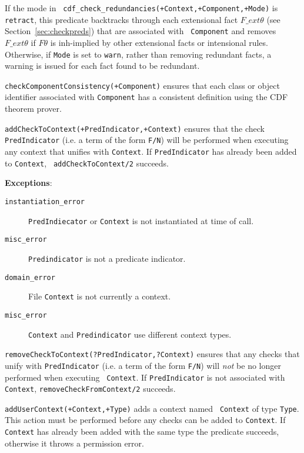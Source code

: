 \begin{description}
If the mode in {\tt
cdf\_check\_redundancies(+Context,+Component,+Mode)} is {\tt retract},
this predicate backtracks through each extensional fact $F\_ext\theta$
(see Section~\ref{sec:checkpreds}) that are associated with {\tt
Component} and removes $F\_ext\theta$ if $F\theta$ is {\sc
inh}-implied by other extensional facts or intensional rules.
Otherwise, if {\tt Mode} is set to {\tt warn}, rather than removing
redundant facts, a warning is issued for each fact found to be
redundant.

{\tt checkComponentConsistency(+Component)} ensures that each class or
object identifier associated with {\tt Component} has a consistent
definition using the CDF theorem prover.

{\tt addCheckToContext(+PredIndicator,+Context)} ensures that the
check {\tt PredIndicator} (i.e. a term of the form {\tt F/N}) will be
performed when executing any context that unifies with {\tt Context}.
If {\tt PredIndicator} has already been added to {\tt Context}, {\tt
addCheckToContext/2} succeeds. 

{\bf Exceptions}:
    \begin{description}
    \item[{\tt instantiation\_error}]
    	{\tt PredIndiecator} or {\tt Context} is not instantiated at
	    time of call. 
    \item[{\tt misc\_error}]
    	{\tt Predindicator} is not a predicate indicator.
    \item[{\tt domain\_error}]
    	File {\tt Context} is not currently a context.
    \item[{\tt misc\_error}]
    	{\tt Context} and {\tt Predindicator} use different context types.
    \end{description}

{\tt removeCheckToContext(?PredIndicator,?Context)} ensures that any
checks that unify with {\tt PredIndicator} (i.e. a term of the form
{\tt F/N}) will {\em not} be no longer performed when executing {\tt
Context}.  If {\tt PredIndicator} is not associated with {\tt
Context}, {\tt removeCheckFromContext/2} succeeds.

{\tt addUserContext(+Context,+Type)} adds a context named {\tt
Context} of type {\tt Type}.  This action must be performed before any
checks can be added to {\tt Context}.  If {\tt Context} has already
been added with the same type the predicate succeeds, otherwise it
throws a permission error.


\end{description}
